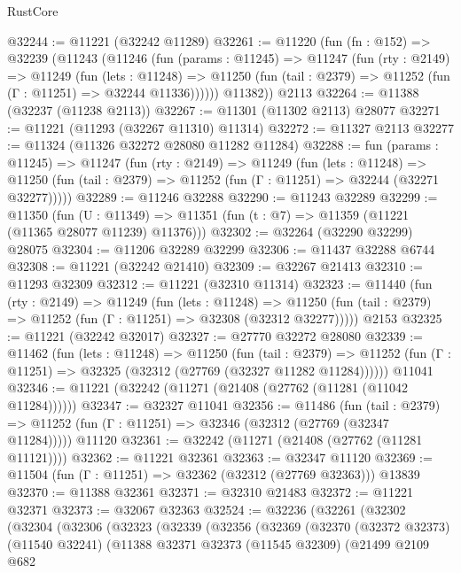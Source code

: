 \begin{lexlean}{RustCore}
\begin{coremodule}
@32244 := @11221 (@32242 @11289)
@32261 := @11220
    (fun (fn : @152) =>
    @32239
      (@11243
        (@11246
          (fun (params : @11245) =>
          @11247
            (fun (rty : @2149) =>
            @11249
              (fun (lets : @11248) =>
              @11250 (fun (tail : @2379) => @11252 (fun (Γ : @11251) => @32244 @11336))))))
        @11382))
    @2113
@32264 := @11388 (@32237 (@11238 @2113))
@32267 := @11301 (@11302 @2113) @28077
@32271 := @11221 (@11293 (@32267 @11310) @11314)
@32272 := @11327 @2113
@32277 := @11324 (@11326 @32272 @28080 @11282 @11284)
@32288 := fun (params : @11245) =>
  @11247
    (fun (rty : @2149) =>
    @11249
      (fun (lets : @11248) =>
      @11250 (fun (tail : @2379) => @11252 (fun (Γ : @11251) => @32244 (@32271 @32277)))))
@32289 := @11246 @32288
@32290 := @11243 @32289
@32299 := @11350
    (fun (U : @11349) => @11351 (fun (t : @7) => @11359 (@11221 (@11365 @28077 @11239) @11376)))
@32302 := @32264 (@32290 @32299) @28075
@32304 := @11206 @32289 @32299
@32306 := @11437 @32288 @6744
@32308 := @11221 (@32242 @21410)
@32309 := @32267 @21413
@32310 := @11293 @32309
@32312 := @11221 (@32310 @11314)
@32323 := @11440
    (fun (rty : @2149) =>
    @11249
      (fun (lets : @11248) =>
      @11250 (fun (tail : @2379) => @11252 (fun (Γ : @11251) => @32308 (@32312 @32277)))))
    @2153
@32325 := @11221 (@32242 @32017)
@32327 := @27770 @32272 @28080
@32339 := @11462
    (fun (lets : @11248) =>
    @11250
      (fun (tail : @2379) =>
      @11252 (fun (Γ : @11251) => @32325 (@32312 (@27769 (@32327 @11282 @11284))))))
    @11041
@32346 := @11221 (@32242 (@11271 (@21408 (@27762 (@11281 (@11042 @11284))))))
@32347 := @32327 @11041
@32356 := @11486
    (fun (tail : @2379) => @11252 (fun (Γ : @11251) => @32346 (@32312 (@27769 (@32347 @11284)))))
    @11120
@32361 := @32242 (@11271 (@21408 (@27762 (@11281 @11121))))
@32362 := @11221 @32361
@32363 := @32347 @11120
@32369 := @11504 (fun (Γ : @11251) => @32362 (@32312 (@27769 @32363))) @13839
@32370 := @11388 @32361
@32371 := @32310 @21483
@32372 := @11221 @32371
@32373 := @32067 @32363
@32524 := @32236
    (@32261
      (@32302
        (@32304
          (@32306
            (@32323
              (@32339
                (@32356
                  (@32369
                    (@32370
                      (@32372 @32373)
                      (@11540 @32241)
                      (@11388
                        @32371
                        @32373
                        (@11545 @32309)
                        (@21499
                          @2109
                          @682

\end{coremodule}
\end{lexlean}
